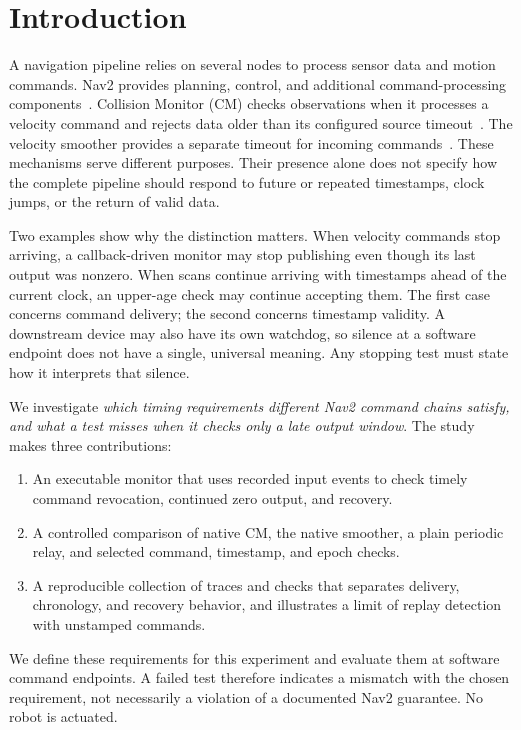 \documentclass[conference]{IEEEtran}
\begin{document}
\section{Introduction}
A navigation pipeline relies on several nodes to process sensor data and motion commands. Nav2 provides planning, control, and additional command-processing components~\cite{nav2}. Collision Monitor (CM) checks observations when it processes a velocity command and rejects data older than its configured source timeout~\cite{cmcode,sourcecode}. The velocity smoother provides a separate timeout for incoming commands~\cite{smoother}. These mechanisms serve different purposes. Their presence alone does not specify how the complete pipeline should respond to future or repeated timestamps, clock jumps, or the return of valid data.

Two examples show why the distinction matters. When velocity commands stop arriving, a callback-driven monitor may stop publishing even though its last output was nonzero. When scans continue arriving with timestamps ahead of the current clock, an upper-age check may continue accepting them. The first case concerns command delivery; the second concerns timestamp validity. A downstream device may also have its own watchdog, so silence at a software endpoint does not have a single, universal meaning. Any stopping test must state how it interprets that silence.

We investigate \emph{which timing requirements different Nav2 command chains satisfy, and what a test misses when it checks only a late output window}. The study makes three contributions:
\begin{enumerate}
\item An executable monitor that uses recorded input events to check timely command revocation, continued zero output, and recovery.
\item A controlled comparison of native CM, the native smoother, a plain periodic relay, and selected command, timestamp, and epoch checks.
\item A reproducible collection of traces and checks that separates delivery, chronology, and recovery behavior, and illustrates a limit of replay detection with unstamped commands.
\end{enumerate}
We define these requirements for this experiment and evaluate them at software command endpoints. A failed test therefore indicates a mismatch with the chosen requirement, not necessarily a violation of a documented Nav2 guarantee. No robot is actuated.
\end{document}
